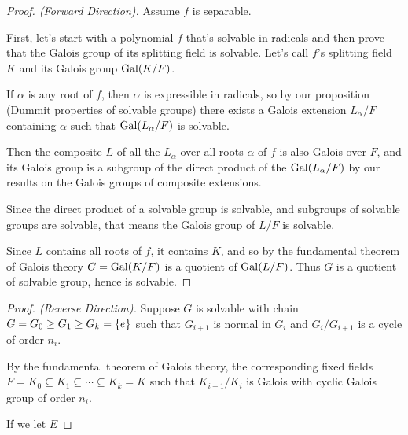\begin{proof}[Proof. (Forward Direction)]

    Assume $f$ is separable.

    First, let's start with a polynomial $f$ that's solvable in radicals and then prove that the Galois group of its splitting field is solvable. Let's call $f$'s splitting field $K$ and its Galois group $\operatorname{Gal}(K/F)$.

    If $\alpha$ is any root of $f$, then $\alpha$ is expressible in radicals, so by our proposition (Dummit properties of solvable groups) there exists a Galois extension $L_{\alpha}/F$ containing $\alpha$ such that $\operatorname{Gal}(L_\alpha/F)$ is solvable.

    Then the composite $L$ of all the $L_\alpha$ over all roots $\alpha$ of $f$ is also Galois over $F$, and its Galois group is a subgroup of the direct product of the $\operatorname{Gal}(L_{\alpha}/F)$ by our results on the Galois groups of composite extensions.

    Since the direct product of a solvable group is solvable, and subgroups of solvable groups are solvable, that means the Galois group of $L/F$ is solvable.

    Since $L$ contains all roots of $f$, it contains $K$, and so by the fundamental theorem of Galois theory $G = \operatorname{Gal}(K/F)$ is a quotient of $\operatorname{Gal}(L/F)$. Thus $G$ is a quotient of solvable group, hence is solvable.
\end{proof}

\begin{proof}[Proof. (Reverse Direction)]
    Suppose $G$ is solvable with chain $G = G_0 \geq G_1 \geq G_k = \left\lbrace e \right\rbrace$ such that $G_{i+1}$ is normal in $G_i$ and $G_i/G_{i+1}$ is a cycle of order $n_i$.

    By the fundamental theorem of Galois theory, the corresponding fixed fields $F = K_0 \subseteq K_1 \subseteq \cdots \subseteq K_k = K$ such that $K_{i + 1}/K_i$ is Galois with cyclic Galois group of order $n_i$.

    If we let $E$
\end{proof}

